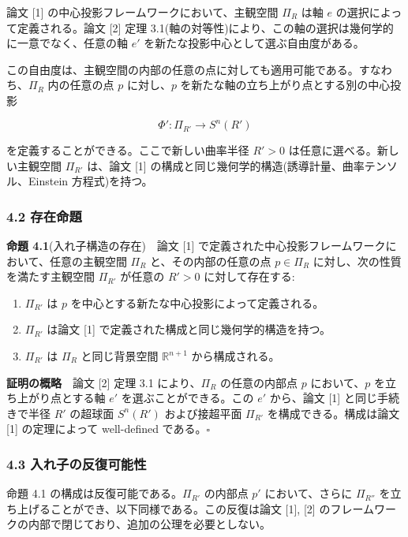 \documentclass[a4paper,11pt]{ltjsarticle}
\theoremstyle{definition}
\providecommand{\tightlist}{\setlength{\itemsep}{0pt}\setlength{\parskip}{0pt}}
\begin{document}
論文 {[}1{]} の中心投影フレームワークにおいて、主観空間 \(\Pi_R\) は軸 \(e\) の選択によって定義される。論文 {[}2{]} 定理 3.1(軸の対等性)により、この軸の選択は幾何学的に一意でなく、任意の軸 \(e'\) を新たな投影中心として選ぶ自由度がある。

この自由度は、主観空間の内部の任意の点に対しても適用可能である。すなわち、\(\Pi_R\) 内の任意の点 \(p\) に対し、\(p\) を新たな軸の立ち上がり点とする別の中心投影

\[
\Phi' : \Pi_{R'} \longrightarrow S^n(R')
\]

を定義することができる。ここで新しい曲率半径 \(R' > 0\) は任意に選べる。新しい主観空間 \(\Pi_{R'}\) は、論文 {[}1{]} の構成と同じ幾何学的構造(誘導計量、曲率テンソル、Einstein 方程式)を持つ。

\subsubsection{4.2 存在命題}\label{ux5b58ux5728ux547dux984c}

\textbf{命題 4.1}(入れ子構造の存在)　論文 {[}1{]} で定義された中心投影フレームワークにおいて、任意の主観空間 \(\Pi_R\) と、その内部の任意の点 \(p \in \Pi_R\) に対し、次の性質を満たす主観空間 \(\Pi_{R'}\) が任意の \(R' > 0\) に対して存在する:

\begin{enumerate}
\def\labelenumi{\arabic{enumi}.}
\tightlist
\item
  \(\Pi_{R'}\) は \(p\) を中心とする新たな中心投影によって定義される。
\item
  \(\Pi_{R'}\) は論文 {[}1{]} で定義された構成と同じ幾何学的構造を持つ。
\item
  \(\Pi_{R'}\) は \(\Pi_R\) と同じ背景空間 \(\mathbb{R}^{n+1}\) から構成される。
\end{enumerate}

\textbf{証明の概略}　論文 {[}2{]} 定理 3.1 により、\(\Pi_R\) の任意の内部点 \(p\) において、\(p\) を立ち上がり点とする軸 \(e'\) を選ぶことができる。この \(e'\) から、論文 {[}1{]} と同じ手続きで半径 \(R'\) の超球面 \(S^n(R')\) および接超平面 \(\Pi_{R'}\) を構成できる。構成は論文 {[}1{]} の定理によって well-defined である。\(\square\)

\subsubsection{4.3 入れ子の反復可能性}\label{ux5165ux308cux5b50ux306eux53cdux5fa9ux53efux80fdux6027}

命題 4.1 の構成は反復可能である。\(\Pi_{R'}\) の内部点 \(p'\) において、さらに \(\Pi_{R''}\) を立ち上げることができ、以下同様である。この反復は論文 {[}1{]}, {[}2{]} のフレームワークの内部で閉じており、追加の公理を必要としない。
\end{document}
